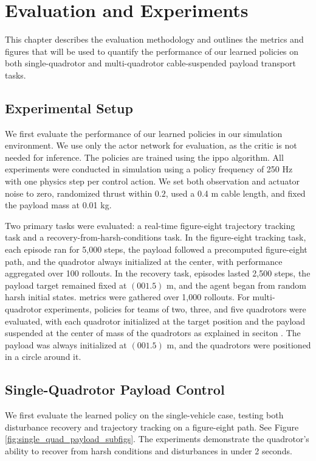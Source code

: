\chapter{Evaluation and Experiments}

This chapter describes the evaluation methodology and outlines the metrics and figures that will be used to quantify the performance of our learned policies on both single-quadrotor and multi-quadrotor cable-suspended payload transport tasks.

\section{Experimental Setup}
We first evaluate the performance of our learned policies in our simulation environment. We use only the actor network for evaluation, as the critic is not needed for inference. The policies are trained using the \gls{ippo} algorithm.
All experiments were conducted in simulation using a policy frequency of 250 Hz with one physics step per control action. We set both observation and actuator noise to zero, randomized thrust within $0.2$, used a 0.4 m cable length, and fixed the payload mass at 0.01 kg. 

Two primary tasks were evaluated: a real-time figure-eight trajectory tracking task and a recovery-from-harsh-conditions task. In the figure-eight tracking task, each episode ran for 5,000 steps, the payload followed a precomputed figure-eight path, and the quadrotor always initialized at the center, with performance aggregated over 100 rollouts. In the recovery task, episodes lasted 2,500 steps, the payload target remained fixed at $(0 0 1.5)$ m, and the agent began from random harsh initial states. metrics were gathered over 1,000 rollouts. For multi-quadrotor experiments, policies for teams of two, three, and five quadrotors were evaluated, with each quadrotor initialized at the target position and the payload suspended at the center of mass of the quadrotors as explained in seciton . The payload was always initialized at $(0 0 1.5)$ m, and the quadrotors were positioned in a circle around it.

\section{Single-Quadrotor Payload Control}
We first evaluate the learned policy on the single-vehicle case, testing both disturbance recovery and trajectory tracking on a figure-eight path. See Figure \ref{fig:single_quad_payload_subfigs}.
The experiments demonstrate the quadrotor's ability to recover from harsh conditions and disturbances in under 2 seconds. 


